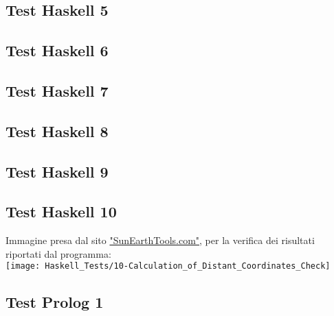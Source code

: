 \documentclass{article}
\begin{document}
\subsection*{Test Haskell 5}

\lstset{inputencoding=utf8/latin1}


\subsection*{Test Haskell 6}

\lstset{inputencoding=utf8/latin1}


\subsection*{Test Haskell 7}

\lstset{inputencoding=utf8/latin1}


\subsection*{Test Haskell 8}

\lstset{inputencoding=utf8/latin1}


\subsection*{Test Haskell 9}

\lstset{inputencoding=utf8/latin1}


\subsection*{Test Haskell 10}

\lstset{inputencoding=utf8/latin1}

	
	\bigskip
	Immagine presa dal sito \href{https://www.sunearthtools.com/it/tools/distance.php}{"SunEarthTools.com"}, per la verifica dei risultati riportati dal programma:\\
	\texttt{[image: Haskell\_Tests/10-Calculation\_of\_Distant\_Coordinates\_Check]}
	
\newpage
\subsection*{Test Prolog 1}
\end{document}
